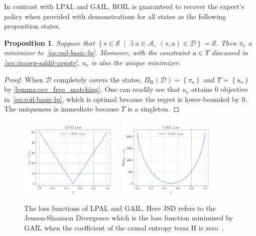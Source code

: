 \documentclass[10pt]{article}
\renewcommand{\cite}{\citep}
\theoremstyle{plain}
\newtheorem{proposition}{Proposition}
\theoremstyle{remark}
\begin{document}
In contrast with LPAL and GAIL, ROIL is guaranteed to recover the expert's policy when provided with demonstrations for all states as the following proposition states.  
\begin{proposition} \label{expert_recovery}
Suppose that $\left\{ s\in \mathcal{S} \; \mid \; \exists\; a\in \mathcal{A}, \; (s,a) \in \mathcal{D} \right\} = \mathcal{S}$. Then $\pi_{\mathrm{e}}$ a minimizer to~\eqref{eq:roil-basic-lp}. Moreover, with the constraint $u\in \Upsilon$ discussed in \cref{sec:incorp-addit-constr}, $u_{\mathrm{e}}$ is also the unique minimizer.
\end{proposition}
\begin{proof}
When $\mathcal{D}$ completely covers the states, $\Pi_{\mathrm{R}}(\mathcal{D}) = \left\{ \pi_{\mathrm{e}} \right\}$ and $\Upsilon = \left\{ u_{\mathrm{e}} \right\}$ by \cref{lemma:occ_freq_matching}. One can readily see that $u_{\mathrm{e}}$ attains $0$ objective in~\eqref{eq:roil-basic-lp}, which is optimal because the regret is lower-bounded by $0$. The uniqueness is immediate because $\Upsilon$ is a singleton.
\end{proof}

\begin{figure}
	\centering
	\includegraphics[width=0.45\textwidth]{../src/plots/all_state/lpal_loss.pdf}
	\includegraphics[width=0.45\textwidth]{../src/plots/all_state/gail_loss.pdf}
	\caption{The loss functions of LPAL and GAIL. Here JSD refers to the Jensen-Shannon Divergence which is the loss function minimized by GAIL when the coefficient of the 
 causal entropy term H is zero~\cite{Ho2016}.}
	\label{fig:loss_of_LPAL_GAIL}
\end{figure}
\end{document}
